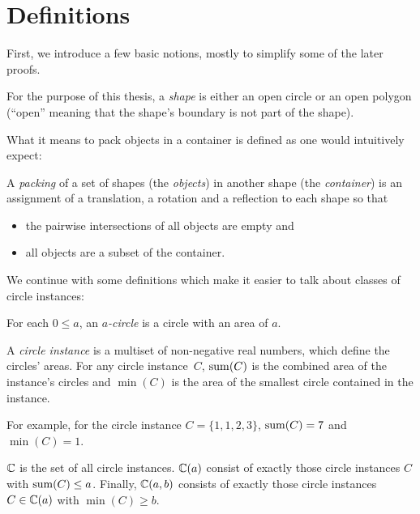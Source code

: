 \documentclass[a4paper,style=print,bibliography=totoc,nexus,lnum,extramargin]{tubsbook}
\begin{document}
\section{Definitions}

First, we introduce a few basic notions, mostly to simplify some of the later proofs.

\begin{definition}
    For the purpose of this thesis, a \emph{shape} is either an open circle or an open polygon (“open” meaning that the shape's boundary is not part of the shape).
\end{definition}

What it means to pack objects in a container is defined as one would intuitively expect:

\begin{definition}
    A \emph{packing} of a set of shapes (the \emph{objects}) in another shape (the \emph{container}) is an assignment of a translation, a rotation and a reflection to each shape so that

    \begin{itemize}
        \item the pairwise intersections of all objects are empty and
        \item all objects are a subset of the container.
    \end{itemize}
\end{definition}

We continue with some definitions which make it easier to talk about classes of circle instances:

\begin{definition}
    For each $0 \le a$, an \emph{$a$-circle} is a circle with an area of $a$.
\end{definition}

\begin{definition}\label{def:circle-instance}
    A \emph{circle instance} is a multiset of non-negative real numbers, which define the circles' areas.
    For any circle instance~$C$, $\operatorname{sum}(C)$ is the combined area of the instance's circles and $\min(C)$ is the area of the smallest circle contained in the instance.
\end{definition}

For example, for the circle instance $C = \{1,1,2,3\}$, $\operatorname{sum}(C) = 7$ and $\min(C) = 1$.

\begin{definition}
    $\mathbb{C}$ is the set of all circle instances. $\mathbb{C}(a)$ consist of exactly those circle instances $C$ with $\operatorname{sum}(C) \le a$. Finally, $\mathbb{C}(a,b)$ consists of exactly those circle instances $C \in \mathbb{C}(a)$ with $\min(C) \ge b$.
\end{definition}
\end{document}
